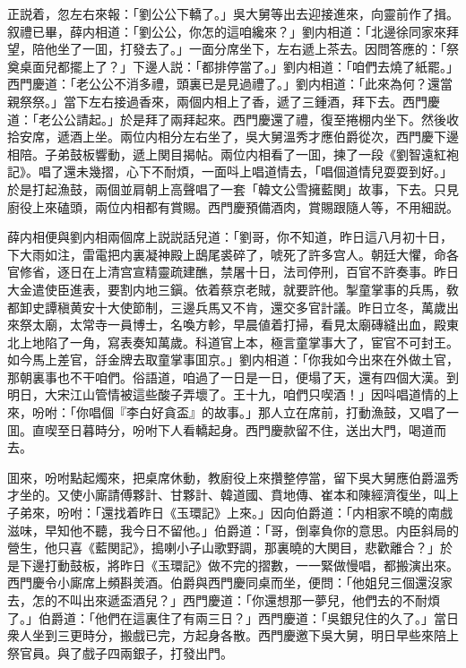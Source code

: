 正説着，忽左右來報：「劉公公下轎了。」吳大舅等出去迎接進來，向靈前作了揖。叙禮已畢，薛内相道：「劉公公，你怎的這咱纔來？」劉内相道：「北邊徐同家來拜望，陪他坐了一囬，打發去了。」一面分席坐下，左右遞上茶去。因問答應的：「祭奠桌面兒都擺上了？」下邊人説：「都排停當了。」劉内相道：「咱們去燒了紙罷。」西門慶道：「老公公不消多禮，頭裏已是見過禮了。」劉内相道：「此來為何？還當親祭祭。」當下左右接過香來，兩個内相上了香，遞了三鍾酒，拜下去。西門慶道：「老公公請起。」於是拜了兩拜起來。西門慶還了禮，復至捲棚内坐下。然後收拾安席，遞酒上坐。兩位内相分左右坐了，吳大舅溫秀才應伯爵從次，西門慶下邊相陪。子弟鼓板響動，遞上関目揭帖。兩位内相看了一囬，揀了一段《劉智遠紅袍記》。唱了還未幾摺，心下不耐煩，一面呌上唱道情去，「唱個道情兒耍耍到好。」於是打起漁鼓，兩個並肩朝上高聲唱了一套「韓文公雪擁藍関」故事，下去。只見廚役上來磕頭，兩位内相都有賞賜。西門慶預備酒肉，賞賜跟隨人等，不用細説。

薛内相便與劉内相兩個席上説説話兒道：「劉哥，你不知道，昨日這八月初十日，下大雨如注，雷電把内裏凝神殿上鴟尾裘碎了，唬死了許多宫人。朝廷大懼，命各官修省，逐日在上清宫宣精靈疏建醮，禁屠十日，法司停刑，百官不許奏事。昨日大金遣使臣進表，要割内地三鎭。依着蔡京老賊，就要許他。掣童掌事的兵馬，敎都卸史譚稹黄安十大使節制，三邊兵馬又不肯，還交多官計議。昨日立冬，萬歲出來祭太廟，太常寺一員博士，名喚方軫，早晨値着打掃，看見太廟磚縫出血，殿東北上地陷了一角，寫表奏知萬歲。科道官上本，極言童掌事大了，宦官不可封王。如今馬上差官，㧱金牌去取童掌事囬京。」劉内相道：「你我如今出來在外做土官，那朝裏事也不干咱們。俗語道，咱過了一日是一日，便塌了天，還有四個大漢。到明日，大宋江山管情被這些酸子弄壞了。王十九，咱們只喫酒！」因呌唱道情的上來，吩咐：「你唱個『李白好貪盃』的故事。」那人立在席前，打動漁鼓，又唱了一囬。直喫至日暮時分，吩咐下人看轎起身。西門慶款留不住，送出大門，喝道而去。

囬來，吩咐點起燭來，把桌席休動，教廚役上來攢整停當，留下吳大舅應伯爵溫秀才坐的。又使小廝請傅夥計、甘夥計、韓道國、賁地傳、崔本和陳經濟復坐，叫上子弟來，吩咐：「還找着昨日《玉環記》上來。」因向伯爵道：「内相家不曉的南戲滋味，早知他不聽，我今日不留他。」伯爵道：「哥，倒辜負你的意思。内臣斜局的營生，他只喜《藍関記》，搗喇小子山歌野調，那裏曉的大関目，悲歡離合？」於是下邊打動鼓板，將昨日《玉環記》做不完的摺數，一一緊做慢唱，都搬演出來。西門慶令小廝席上頻斟羙酒。伯爵與西門慶同桌而坐，便問：「他姐兒三個還沒家去，怎的不叫出來遞盃酒兒？」西門慶道：「你還想那一夢兒，他們去的不耐煩了。」伯爵道：「他們在這裏住了有兩三日？」西門慶道：「吳銀兒住的久了。」當日衆人坐到三更時分，搬戲已完，方起身各散。西門慶邀下吳大舅，明日早些來陪上祭官員。與了戲子四兩銀子，打發出門。

